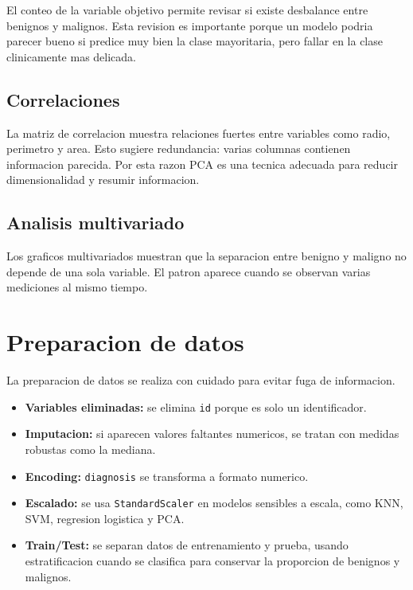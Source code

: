 \documentclass[12pt,letterpaper]{article}
\begin{document}
El conteo de la variable objetivo permite revisar si existe desbalance entre benignos y malignos. Esta revision es importante porque un modelo podria parecer bueno si predice muy bien la clase mayoritaria, pero fallar en la clase clinicamente mas delicada.

\subsection{Correlaciones}

La matriz de correlacion muestra relaciones fuertes entre variables como radio, perimetro y area. Esto sugiere redundancia: varias columnas contienen informacion parecida. Por esta razon PCA es una tecnica adecuada para reducir dimensionalidad y resumir informacion.

\subsection{Analisis multivariado}

Los graficos multivariados muestran que la separacion entre benigno y maligno no depende de una sola variable. El patron aparece cuando se observan varias mediciones al mismo tiempo.

\section{Preparacion de datos}

La preparacion de datos se realiza con cuidado para evitar fuga de informacion.

\begin{itemize}[leftmargin=*]
    \item \textbf{Variables eliminadas:} se elimina \texttt{id} porque es solo un identificador.
    \item \textbf{Imputacion:} si aparecen valores faltantes numericos, se tratan con medidas robustas como la mediana.
    \item \textbf{Encoding:} \texttt{diagnosis} se transforma a formato numerico.
    \item \textbf{Escalado:} se usa \texttt{StandardScaler} en modelos sensibles a escala, como KNN, SVM, regresion logistica y PCA.
    \item \textbf{Train/Test:} se separan datos de entrenamiento y prueba, usando estratificacion cuando se clasifica para conservar la proporcion de benignos y malignos.
\end{itemize}
\end{document}
